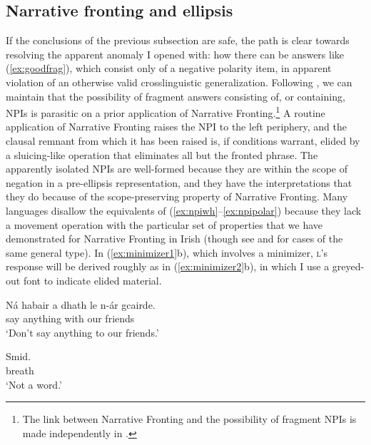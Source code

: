 \documentclass[output=paper,colorlinks,citecolor=brown]{langscibook}
\begin{document}
\subsection{Narrative fronting and ellipsis}

If the conclusions of the previous subsection are safe, the path is clear towards resolving the apparent anomaly I opened with: how there can be answers like (\ref{ex:goodfrag}), which consist only of a negative polarity item, in apparent violation of an otherwise valid crosslinguistic generalization. Following \citet[691]{merchant:04}, we can maintain that the possibility of fragment answers consisting of, or containing, NPIs is parasitic on a prior application of Narrative Fronting.\footnote{The link between Narrative Fronting and the possibility of fragment NPIs is made independently in \citet{dantuono-diss}.}  A routine application of Narrative Fronting raises the NPI to the left periphery, and the clausal remnant from which it has been raised is, if conditions warrant, elided by a sluicing-like operation that eliminates all but the fronted phrase.  The apparently isolated NPIs are well-formed because they are within the scope of negation in a pre-ellipsis representation, and they have the interpretations that they do because of the scope-preserving property of Narrative Fronting.  Many languages disallow the equivalents of (\ref{ex:npiwh}--\ref{ex:npipolar}) because they lack a movement operation with the particular set of properties that we have demonstrated for Narrative Fronting in Irish (though see \cite{laka:93} and \cite{giannakidou:00} for cases of the same general type).  In (\ref{ex:minimizer1}b), which involves a minimizer, {\scshape l}'s response will be derived roughly as in (\ref{ex:minimizer2}b), in which I use a greyed-out font to indicate elided material.

\ea\label{ex:minimizer1}
\ea
\begin{xlist}
\gll  Ná habair {a dhath} le n-ár gcairde. \\
     {\no} {say\impv} anything with our friends \\
\glt `Don't say anything to our friends.'
\end{xlist}
\ex
\begin{xlist}
\gll Smid. \\
     breath \\
\glt `Not a word.'\label{ex:smid}
\end{xlist}
\z
\z
{}
\end{document}
